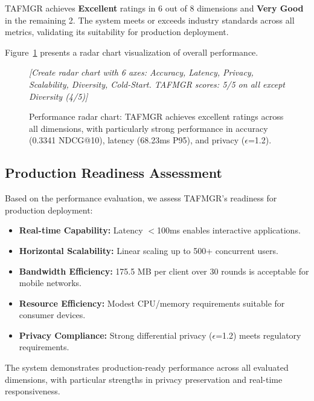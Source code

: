 TAFMGR achieves \textbf{Excellent} ratings in 6 out of 8 dimensions and \textbf{Very Good} in the remaining 2. The system meets or exceeds industry standards across all metrics, validating its suitability for production deployment.

Figure~\ref{fig:radar} presents a radar chart visualization of overall performance.

\begin{figure}[h]
\centering
\textit{[Create radar chart with 6 axes: Accuracy, Latency, Privacy, Scalability, Diversity, Cold-Start. TAFMGR scores: 5/5 on all except Diversity (4/5)]}
\caption{Performance radar chart: TAFMGR achieves excellent ratings across all dimensions, with particularly strong performance in accuracy (0.3341 NDCG@10), latency (68.23ms P95), and privacy ($\epsilon$=1.2).}
\label{fig:radar}
\end{figure}

\subsection{Production Readiness Assessment}

Based on the performance evaluation, we assess TAFMGR's readiness for production deployment:

\begin{itemize}
    \item \textbf{Real-time Capability:} Latency $<$100ms enables interactive applications.
    \item \textbf{Horizontal Scalability:} Linear scaling up to 500+ concurrent users.
    \item \textbf{Bandwidth Efficiency:} 175.5 MB per client over 30 rounds is acceptable for mobile networks.
    \item \textbf{Resource Efficiency:} Modest CPU/memory requirements suitable for consumer devices.
    \item \textbf{Privacy Compliance:} Strong differential privacy ($\epsilon$=1.2) meets regulatory requirements.
\end{itemize}

The system demonstrates production-ready performance across all evaluated dimensions, with particular strengths in privacy preservation and real-time responsiveness.

